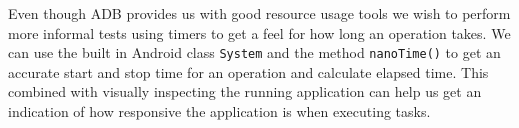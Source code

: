 Even though ADB provides us with good resource usage tools we wish to perform more informal tests using timers to get a feel for how long an operation takes. We can use the built in Android class \texttt{System} and the method \texttt{nanoTime()} to get an accurate start and stop time for an operation and calculate elapsed time. This combined with visually inspecting the running application can help us get an indication of how responsive the application is when executing tasks.
